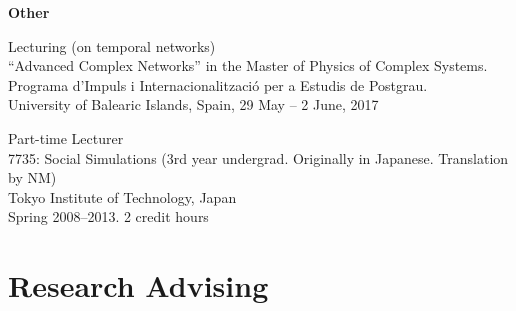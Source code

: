 \documentclass[11pt,letter]{article}
\renewenvironment{itemize}{
  \begin{list}{}{
    \setlength{\leftmargin}{1.5em}
    \setlength{\itemsep}{0.25em}
    \setlength{\parskip}{0pt}
    \setlength{\parsep}{0.25em}
  }
}{
  \end{list}
}
\begin{document}
\begin{itemize}
\item \textbf{Other}


\item
Lecturing (on temporal networks)\\
``Advanced Complex Networks'' in the Master of Physics of Complex Systems.\\
Programa d'Impuls i Internacionalitzaci\'{o} per a Estudis de Postgrau.\\
University of Balearic Islands, Spain, 29 May -- 2 June, 2017

\item
Part-time Lecturer\\
7735: Social Simulations (3rd year undergrad. Originally in Japanese. Translation by NM)\\
Tokyo Institute of Technology, Japan\\
Spring 2008--2013. 2 credit hours


\end{itemize}

\section*{\bf \normalsize Research Advising}
\end{document}
